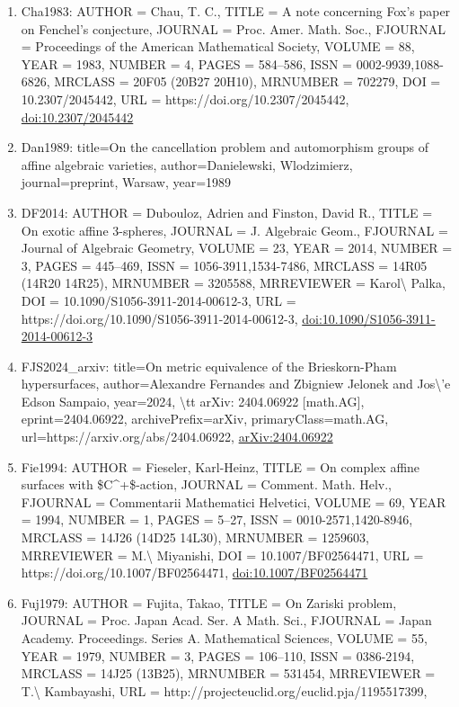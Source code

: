 \documentclass[11pt]{article}
\begin{document}
\begin{enumerate}[leftmargin=*]
  \item Cha1983: AUTHOR = Chau, T. C., TITLE = A note concerning Fox's paper on Fenchel's conjecture, JOURNAL = Proc. Amer. Math. Soc., FJOURNAL = Proceedings of the American Mathematical Society, VOLUME = 88, YEAR = 1983, NUMBER = 4, PAGES = 584--586, ISSN = 0002-9939,1088-6826, MRCLASS = 20F05 (20B27 20H10), MRNUMBER = 702279, DOI = 10.2307/2045442, URL = https://doi.org/10.2307/2045442, \href{https://doi.org/10.2307/2045442}{doi:10.2307/2045442}
  \item Dan1989: title=On the cancellation problem and automorphism groups of affine algebraic varieties, author=Danielewski, Wlodzimierz, journal=preprint, Warsaw, year=1989
  \item DF2014: AUTHOR = Dubouloz, Adrien and Finston, David R., TITLE = On exotic affine 3-spheres, JOURNAL = J. Algebraic Geom., FJOURNAL = Journal of Algebraic Geometry, VOLUME = 23, YEAR = 2014, NUMBER = 3, PAGES = 445--469, ISSN = 1056-3911,1534-7486, MRCLASS = 14R05 (14R20 14R25), MRNUMBER = 3205588, MRREVIEWER = Karol\textbackslash{} Palka, DOI = 10.1090/S1056-3911-2014-00612-3, URL = https://doi.org/10.1090/S1056-3911-2014-00612-3, \href{https://doi.org/10.1090/S1056-3911-2014-00612-3}{doi:10.1090/S1056-3911-2014-00612-3}
  \item FJS2024\_arxiv: title=On metric equivalence of the Brieskorn-Pham hypersurfaces, author=Alexandre Fernandes and Zbigniew Jelonek and Jos\textbackslash{}'e Edson Sampaio, year=2024, \textbackslash{}tt arXiv: 2404.06922 [math.AG], eprint=2404.06922, archivePrefix=arXiv, primaryClass=math.AG, url=https://arxiv.org/abs/2404.06922, \href{https://arxiv.org/abs/2404.06922}{arXiv:2404.06922}
  \item Fie1994: AUTHOR = Fieseler, Karl-Heinz, TITLE = On complex affine surfaces with \$C\^{}+\$-action, JOURNAL = Comment. Math. Helv., FJOURNAL = Commentarii Mathematici Helvetici, VOLUME = 69, YEAR = 1994, NUMBER = 1, PAGES = 5--27, ISSN = 0010-2571,1420-8946, MRCLASS = 14J26 (14D25 14L30), MRNUMBER = 1259603, MRREVIEWER = M.\textbackslash{} Miyanishi, DOI = 10.1007/BF02564471, URL = https://doi.org/10.1007/BF02564471, \href{https://doi.org/10.1007/BF02564471}{doi:10.1007/BF02564471}
  \item Fuj1979: AUTHOR = Fujita, Takao, TITLE = On Zariski problem, JOURNAL = Proc. Japan Acad. Ser. A Math. Sci., FJOURNAL = Japan Academy. Proceedings. Series A. Mathematical Sciences, VOLUME = 55, YEAR = 1979, NUMBER = 3, PAGES = 106--110, ISSN = 0386-2194, MRCLASS = 14J25 (13B25), MRNUMBER = 531454, MRREVIEWER = T.\textbackslash{} Kambayashi, URL = http://projecteuclid.org/euclid.pja/1195517399,

\end{enumerate}
\end{document}
